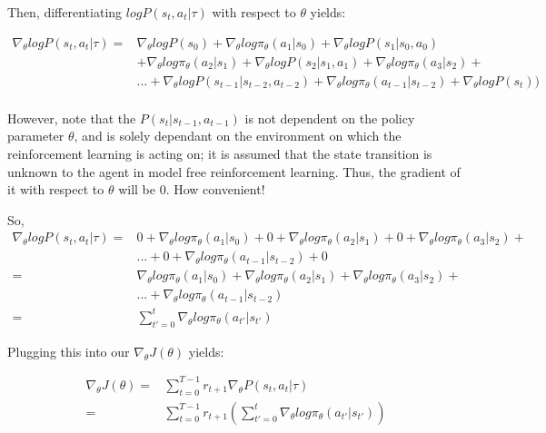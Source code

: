 \documentclass[letterpaper,11pt]{article}
\begin{document}
Then,  differentiating $log P(s_{t}, a_{t} | \tau)$ with respect to $\theta$ yields: 

$$
\begin{aligned}
    \nabla_{\theta} log P(s_{t}, a_{t} | \tau)  ={}& \nabla_{\theta} log P(s_{0}) + \nabla_{\theta} log \pi_{\theta}(a_{1} | s_{0}) + \nabla_{\theta} log P(s_{1} | s_{0}, a_{0}) \\
& + \nabla_{\theta} log \pi_{\theta}(a_{2} | s_{1}) + \nabla_{\theta} log P(s_{2} | s_{1}, a_{1}) + \nabla_{\theta} log \pi_{\theta}(a_{3} | s_{2}) + \\
& ... + \nabla_{\theta} log P(s_{t-1} | s_{t-2}, a_{t-2}) + \nabla_{\theta} log \pi_{\theta}(a_{t-1} | s_{t-2}) + \nabla_{\theta} log P(s_{t})) \\
\end{aligned}
$$

However, note that the $P(s_{t} | s_{t-1}, a_{t-1})$ is not dependent on the policy parameter $\theta$, and is solely dependant on the environment on which the reinforcement learning is acting on; it is assumed that the state transition is unknown to the agent in model free reinforcement learning. Thus, the gradient of it with respect to $\theta$ will be 0. How convenient! 

So, 
$$
\begin{aligned}
    \nabla_{\theta} log P(s_{t}, a_{t} | \tau) ={}& 0 + \nabla_{\theta} log \pi_{\theta}(a_{1} | s_{0}) + 0 + \nabla_{\theta} log \pi_{\theta}(a_{2} | s_{1}) + 0 + \nabla_{\theta} log \pi_{\theta}(a_{3} | s_{2}) + \\ & {} ... {} + {} 0 + \nabla_{\theta} log \pi_{\theta}(a_{t-1} | s_{t-2}) + 0 \\ ={}& \nabla_{\theta} log \pi_{\theta}(a_{1} | s_{0}) + \nabla_{\theta} log \pi_{\theta}(a_{2} | s_{1}) + \nabla_{\theta} log \pi_{\theta}(a_{3} | s_{2}) + \\
& ... + \nabla_{\theta} log \pi_{\theta}(a_{t-1} | s_{t-2}) \\ ={}& \sum\limits_{t'=0}^{t} \nabla_{\theta} log \pi_{\theta}(a_{t'} | s_{t'})                                                
\end{aligned}
$$

Plugging this into our $\nabla_{\theta} J(\theta)$ yields:

$$
\begin{aligned}
    \nabla_{\theta} J(\theta) ={}& \sum\limits_{t=0}^{T-1} r_{t+1} \nabla_{\theta} P(s_{t}, a_{t} | \tau) \\ ={}& \sum\limits_{t=0}^{T-1} r_{t+1} (\sum_{t'=0}^{t} \nabla_{\theta} log \pi_{\theta}(a_{t'} | s_{t'}))
\end{aligned}
$$
\end{document}
